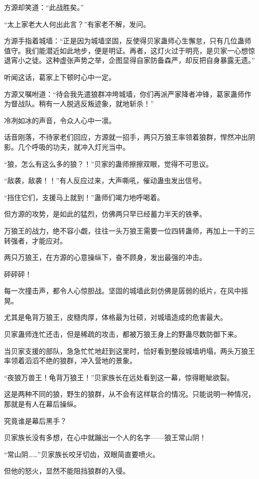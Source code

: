 \begin{this_body}
方源却笑道：“此战胜矣。”

“太上家老大人何出此言？”有家老不解，发问。

方源手指着城墙：“正是因为城墙坚固，反使得贝家蛊师心生懈怠，只有几位蛊师值守。我们能潜近如此地步，便是明证。再者，这灯火过于明亮，是贝家一心想惊退宵小之徒。这种虚张声势之举，企图显得自家防备森严，却反把自身暴露无遗。”

听闻这话，葛家上下顿时心中一定。

方源又嘱咐道：“待会我先遣狼群冲垮城墙，你们再派严家降者冲锋，葛家蛊师作为督战队。稍有一人脱逃反叛迹象，就地斩杀！”

冷冽如冰的声音，令众人心中一凛。

话音刚落，不待家老们回应，方源就一招手，两只万狼王率领着狼群，悍然冲出阴影。几个呼吸的功夫，就冲入灯光当中。

“狼，怎么有这么多的狼？！”贝家的蛊师擦擦双眼，觉得不可思议。

“敌袭，敌袭！！”有人反应过来，大声嘶吼，催动蛊虫发出信号。

“挡住它们，支援马上就到！”蛊师们竭力地呼喝着。

但方源的攻势，是如此的猛烈，仿佛两只早已经蓄力半天的铁拳。

万狼王的战力，绝不容小觑，往往一头万狼王需要一位四转蛊师，再加上一干的三转强者，才能应对。

两只万狼王，在方源的心意操纵下，奋不顾身，发出最强的冲击。

砰砰砰！

每一次撞击声，都令人心惊胆战。坚固的城墙此刻仿佛是孱弱的纸片，在风中摇晃。

尤其是龟背万狼王，皮糙肉厚，体格最为壮硕，对城墙造成的危害最大。

贝家蛊师连忙还击，但是稀疏的攻击，都被万狼王身上的野蛊尽数防御下来。

当贝家支援的部队，急急忙忙地赶到这里时，恰好看到整段城墙坍塌，两头万狼王率领着滔滔不绝的狼群，冲入营地的景象。

“夜狼万兽王！龟背万狼王！”贝家族长在远处看到这一幕，惊得睚眦欲裂。

这是两种不同的狼，野生的狼群，从不会有这样联合的情况。只能说明一种情况，那就是有人在幕后操纵。

究竟谁是幕后黑手？

贝家族长没有多想，在心中就蹦出一个人的名字——狼王常山阴！

“常山阴……”贝家族长咬牙切齿，双眼简直要喷火。

但他的怒火，显然不能阻挡狼群的入侵。


\end{this_body}
